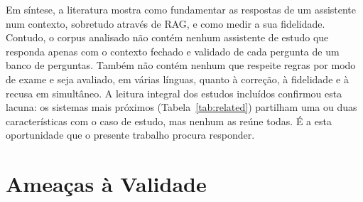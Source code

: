 Em síntese, a literatura mostra como fundamentar as respostas de um assistente num contexto, sobretudo através de \gls{RAG}, e como medir a sua fidelidade. Contudo, o corpus analisado não contém nenhum assistente de estudo que responda apenas com o contexto fechado e validado de cada pergunta de um banco de perguntas. Também não contém nenhum que respeite regras por modo de exame e seja avaliado, em várias línguas, quanto à correção, à fidelidade e à recusa em simultâneo. A leitura integral dos estudos incluídos confirmou esta lacuna: os sistemas mais próximos (Tabela~\ref{tab:related}) partilham uma ou duas características com o caso de estudo, mas nenhum as reúne todas. É a esta oportunidade que o presente trabalho procura responder.

\section{Ameaças à Validade}
\label{sec:chap2_threats}

